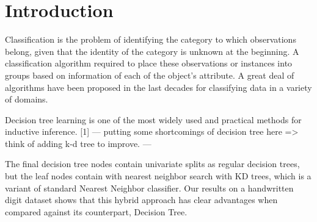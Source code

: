 \section{Introduction}
Classification is the problem of identifying the category to which observations belong, given that the identity of the category is unknown at the beginning. A classification algorithm required to place these observations or instances into groups based on information of each of the object’s attribute. A great deal of algorithms have been proposed in the last decades for classifying data in a variety of domains.

	Decision tree learning is one of the most widely used and practical methods for inductive inference. [1] --- putting some shortcomings of decision tree here => think of adding k-d tree to improve. ---

	The final decision tree nodes contain univariate splits as regular decision trees, but the leaf nodes contain with nearest neighbor search with KD trees, which is a variant of standard Nearest Neighbor classifier. Our results on a handwritten digit dataset shows that this hybrid approach has clear advantages when compared against its counterpart, Decision Tree.

